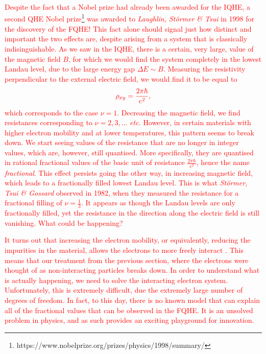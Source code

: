  \textcolor{red}{Despite the fact that a Nobel prize had already been awarded for the IQHE, a second QHE Nobel prize\footnote{https://www.nobelprize.org/prizes/physics/1998/summary/} was awarded to \textit{Laughlin, Störmer \& Tsui} \cite{Laughlin:1983fy, PhysRevLett.48.1559} in 1998 for the discovery of the FQHE! This fact alone should signal just how distinct and important the two effects are, despite arising from a system that is classically indisinguishable. As we saw in the IQHE, there is a certain, very large, value of the magnetic field $B$, for which we would find the system completely in the lowest Landau level, due to the large energy gap $\Delta E \sim B$. Measuring the resistivity perpendicular to the external electric field, we would find it to be equal to}
\begin{align}
    \textcolor{red}{ \rho_{x y} = \frac{2\pi\hbar}{e^2},}
\end{align}
 \textcolor{red}{ which corresponds to the case $\nu=1$. Decreasing the magnetic field, we find resistances corresponding to $\nu=2,3,...$ \textit{etc.} However, in certain materials with higher electron mobility \cite{yoshioka2002the} and at lower temperatures, this pattern seems to break down. We start seeing values of the resistance that are  no longer in integer values, which are, however, still quanti\textcolor{red}{s}ed.  More specifically, they are quanti\textcolor{red}{s}ed in rational fractional values of the basic unit of resistance $\frac{2 \pi\hbar}{e^2}$, hence the name \textit{fractional}. This effect persists going the other way, in increasing magnetic field, which leads to a fractionally filled lowest Landau level. This is what \textit{Störmer, Tsui \& Gossard} \cite{PhysRevLett.48.1559} observed in 1982, when they measured the resistance for a fractional filling of $\nu=\frac{1}{3}$. It appears as though the Landau levels are only fractionally filled, yet the resistance in the direction along the electric field is still vanishing. What could be happening?}

 \textcolor{red}{It turns out that increasing the electron mobility, or equivalently, reducing the impurities in the material, allows the electrons to more freely interact \cite{PhysRevB.37.8476}. This means that our treatment from the previous section, where the electrons were thought of as non-interacting particles breaks down. In order to understand what is actually happening, we need to solve the interacting electron system. Unfortunately, this is extremely difficult, due the extremely large number of degrees of freedom. In fact, to this day, there is no known model that can explain all of the fractional values that can be observed in the FQHE. It is an unsolved problem in physics, and as such provides an exciting playground for innovation.}
 
